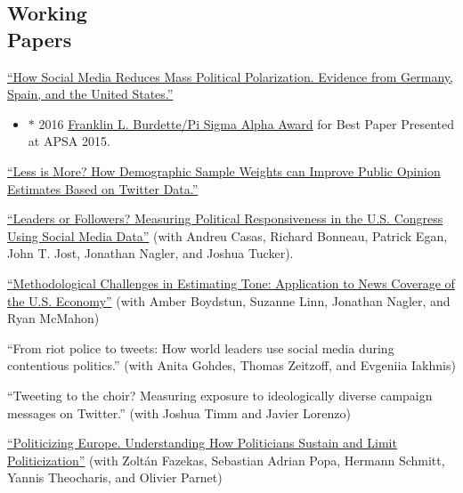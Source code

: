 \documentclass[margin,line,11pt]{resume}
\begin{document}
\begin{resume}
    \section{\mysidestyle Working\\Papers} 
    
\href{http://www.pablobarbera.com/static/barbera_polarization_APSA.pdf}{``How Social Media Reduces Mass Political Polarization. Evidence from Germany, Spain, and the United States.''} 
\begin{itemize}
\item[] $\ast$ 2016 \href{http://www.apsanet.org/PROGRAMS/APSA-Awards/Franklin-L-Burdette-Pi-Sigma-Alpha-Award}{Franklin L. Burdette/Pi Sigma Alpha Award} for Best Paper Presented at APSA 2015.
\end{itemize}

\href{http://pablobarbera.com/static/less-is-more.pdf}{``Less is More? How Demographic Sample Weights can Improve Public Opinion Estimates Based on Twitter Data.''}

\href{http://pablobarbera.com/static/barbera_twitter_responsiveness.pdf}{``Leaders or Followers? Measuring Political Responsiveness in the U.S. Congress Using Social Media Data''} (with Andreu Casas, Richard Bonneau, Patrick Egan, John T. Jost, Jonathan Nagler, and Joshua Tucker).

\href{http://politics.as.nyu.edu/docs/IO/2798/econmedia_mpsa2016_methods_rvBBLMN.pdf}{``Methodological Challenges in Estimating Tone: Application to News Coverage of the U.S. Economy''} (with Amber Boydstun, Suzanne Linn, Jonathan Nagler, and Ryan McMahon)


``From riot police to tweets: How world leaders use social media during contentious politics.'' (with Anita Gohdes, Thomas Zeitzoff, and Evgeniia Iakhnis)

``Tweeting to the choir? Measuring exposure to ideologically diverse campaign messages on Twitter.'' (with Joshua Timm and Javier Lorenzo)

\href{https://zfazekas.github.io/pdfs/eupolit.pdf}{``Politicizing Europe. Understanding How Politicians Sustain and Limit Politicization''} (with Zolt\'{a}n Fazekas, Sebastian Adrian Popa, Hermann Schmitt, Yannis Theocharis, and Olivier Parnet)






\end{resume}
\end{document}
